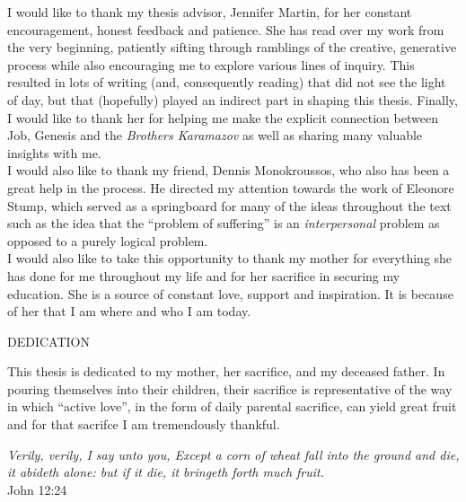 I would like to thank my thesis advisor, Jennifer Martin, for her constant encouragement, honest feedback and patience. She has read over my work from the very beginning, patiently sifting through ramblings of the creative, generative process while also encouraging me to explore various lines of inquiry. This resulted in lots of writing (and, consequently reading) that did not see the light of day, but that (hopefully) played an indirect part in shaping this thesis. Finally, I would like to thank her for helping me make the explicit connection between Job, Genesis and the \emph{Brothers Karamazov} as well as sharing many valuable insights with me.\\

I would also like to thank my friend, Dennis Monokroussos, who also has been a great help in the process. He directed my attention towards the work of Eleonore Stump, which served as a springboard for many of the ideas throughout the text such as the idea that the ``problem of suffering'' is an \emph{interpersonal} problem as opposed to a purely logical problem. \\

I would also like to take this opportunity to thank my mother for everything she has done for me throughout my life and for her sacrifice in securing my education. She is a source of constant love, support and inspiration. It is because of her that I am where and who I am today. \\

\centerline{DEDICATION}

This thesis is dedicated to my mother, her sacrifice, and my deceased father. In pouring themselves into their children, their sacrifice is representative of the way in which ``active love'', in the form of daily parental sacrifice, can yield great fruit and for that sacrifce I am tremendously thankful. \\

\begin{center}
{\emph{Verily, verily, I say unto you, Except a corn of wheat fall into the ground and die, it abideth alone: but if it die, it bringeth forth much fruit.} \\ John 12:24}
\end{center}

